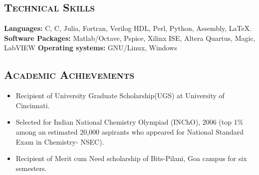 \documentclass[10pt]{article}
\newcommand{\CPP}
{C\nolinebreak[4]\hspace{-.05em}\raisebox{.22ex}{\footnotesize\bf ++}}
\begin{document}
\subsection*{\textsc{\large Technical Skills}}
\textbf{Languages:} C, \CPP , Julia, Fortran, Verilog HDL, Perl, Python, Assembly, \LaTeX. \newline
\textbf{Software Packages:} Matlab/Octave, Pspice, Xilinx ISE, Altera Quartus, Magic, LabVIEW \newline
\textbf{Operating systems:} GNU/Linux, Windows


\subsection*{\textsc{\large Academic Achievements}}
\begin{itemize}
\item Recipient of University Graduate Scholarship(UGS) at University of Cincinnati.
\item Selected for Indian National Chemistry Olympiad (INChO), 2006 (top 1\% among an estimated 20,000 aspirants who appeared for National Standard Exam in Chemistry- NSEC).
\item Recipient of Merit cum Need scholarship of Bits-Pilani, Goa campus for six semesters.
\end{itemize}

\end{document}
